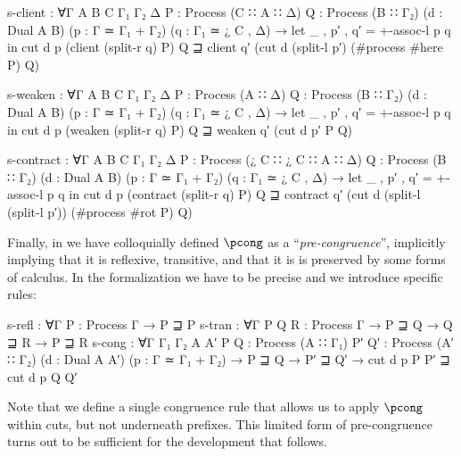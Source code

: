 \begin{AgdaAlign}
\begin{code}[hide]
  s-client :
    ∀{Γ A B C Γ₁ Γ₂ Δ}
    {P : Process (C ∷ A ∷ Δ)}
    {Q : Process (B ∷ Γ₂)}
    (d : Dual A B) (p : Γ ≃ Γ₁ + Γ₂) (q : Γ₁ ≃ ¿ C , Δ) →
    let _ , p′ , q′ = +-assoc-l p q in
    cut d p (client (split-r q) P) Q ⊒
    client q′ (cut d (split-l p′) (#process #here P) Q)

  s-weaken :
    ∀{Γ A B C Γ₁ Γ₂ Δ}
    {P : Process (A ∷ Δ)}
    {Q : Process (B ∷ Γ₂)}
    (d : Dual A B) (p : Γ ≃ Γ₁ + Γ₂) (q : Γ₁ ≃ ¿ C , Δ) →
    let _ , p′ , q′ = +-assoc-l p q in
    cut d p (weaken (split-r q) P) Q ⊒
    weaken q′ (cut d p′ P Q)

  s-contract :
    ∀{Γ A B C Γ₁ Γ₂ Δ}
    {P : Process (¿ C ∷ ¿ C ∷ A ∷ Δ)}
    {Q : Process (B ∷ Γ₂)}
    (d : Dual A B) (p : Γ ≃ Γ₁ + Γ₂) (q : Γ₁ ≃ ¿ C , Δ) →
    let _ , p′ , q′ = +-assoc-l p q in
    cut d p (contract (split-r q) P) Q ⊒
    contract q′ (cut d (split-l (split-l p′)) (#process #rot P) Q)
\end{code}

Finally, in  we have colloquially defined $\pcong$ as a
``\emph{pre-congruence}'', implicitly implying that it is reflexive, transitive,
and that it is is preserved by some forms of calculus. In the formalization we
have to be precise and we introduce specific rules:

\begin{code}
  s-refl  : ∀{Γ} {P : Process Γ} → P ⊒ P
  s-tran  : ∀{Γ} {P Q R : Process Γ} → P ⊒ Q → Q ⊒ R → P ⊒ R
  s-cong  : ∀{Γ Γ₁ Γ₂ A A′} {P Q : Process (A ∷ Γ₁)} {P′ Q′ : Process (A′ ∷ Γ₂)}
            (d : Dual A A′) (p : Γ ≃ Γ₁ + Γ₂) → P ⊒ Q → P′ ⊒ Q′ →
            cut d p P P′ ⊒ cut d p Q Q′
\end{code}

Note that we define a single congruence rule 
that allows us to apply $\pcong$ within cuts, but not underneath prefixes. This
limited form of pre-congruence turns out to be sufficient for the development
that follows.
\end{AgdaAlign}

